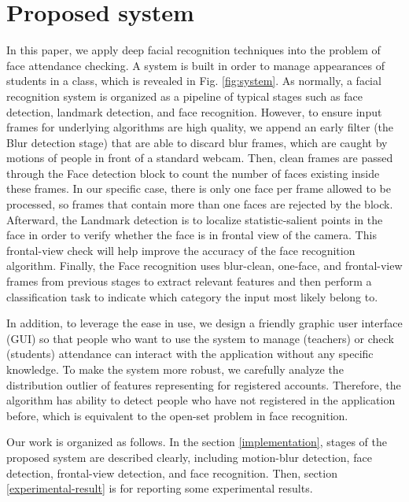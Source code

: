 \documentclass[journal, twocolumn]{IEEEtran}
\begin{document}
\section{Proposed system}
\label{proposed-system}

In this paper, we apply deep facial recognition techniques into the problem of face attendance checking. A system is built in order to manage appearances of students in a class, which is revealed in Fig. \ref{fig:system}. As normally, a facial recognition system is organized as a pipeline of typical stages such as face detection, landmark detection, and face recognition. However, to ensure input frames for underlying algorithms are high quality, we append an early filter (the Blur detection stage) that are able to discard blur frames, which are caught by motions of people in front of a standard webcam. Then, clean frames are passed through the Face detection block to count the number of faces existing inside these frames. In our specific case, there is only one face per frame allowed to be processed, so frames that contain more than one faces are rejected by the block. Afterward, the Landmark detection is to localize statistic-salient points in the face in order to verify whether the face is in frontal view of the camera. This frontal-view check will help improve the accuracy of the face recognition algorithm. Finally, the Face recognition uses blur-clean, one-face, and frontal-view frames from previous stages to extract relevant features and then perform a classification task to indicate which category the input most likely belong to.

In addition, to leverage the ease in use, we design a friendly graphic user interface (GUI) so that people who want to use the system to manage (teachers) or check (students) attendance can interact with the application without any specific knowledge. To make the system more robust, we carefully analyze the distribution outlier of features representing for registered accounts. Therefore, the algorithm has ability to detect people who have not registered in the application before, which is equivalent to the open-set problem in face recognition.

Our work is organized as follows. In the section \ref{implementation}, stages of the proposed system are described clearly, including motion-blur detection, face detection, frontal-view detection, and face recognition. Then, section \ref{experimental-result} is for reporting some experimental results.
\end{document}
